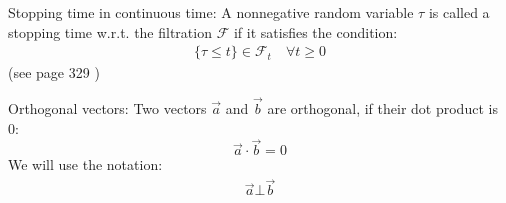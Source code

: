 \theoremstyle{definition}
\begin{definition}{Stopping time in continuous time: }\label{stopTime}
A nonnegative random variable $\tau$ is called a stopping time w.r.t. the filtration $\mathcal{F}$ if it satisfies the condition:
\begin{align}
\{\tau \leq t \} \in \mathcal{F}_t \quad \forall t \geq 0
\end{align}
(see page 329 \parencite{finKont})
\end{definition}

\theoremstyle{definition}
\begin{definition}{Orthogonal vectors: }\label{OrthogonalVec}
Two vectors $\overrightarrow{a}$ and $\overrightarrow{b}$ are orthogonal, if their dot product is 0:
$$\overrightarrow{a} \cdot \overrightarrow{b} = 0$$
We will use the notation:
\begin{equation}
\begin{split}
\overrightarrow{a} \bot \overrightarrow{b}
\end{split}
\end{equation}

\end{definition}